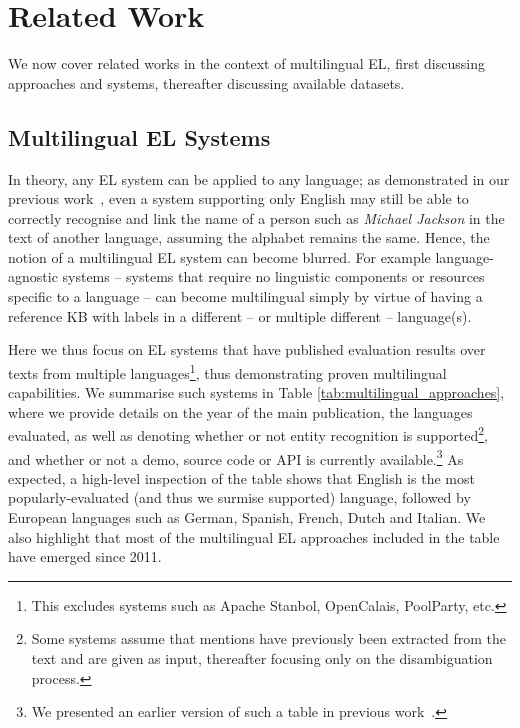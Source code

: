 \documentclass{llncs}
\begin{document}
\section{Related Work}
\label{sec:relatedWork}

We now cover related works in the context of multilingual EL, first discussing approaches and systems, thereafter discussing available datasets.

\subsection{Multilingual EL Systems}
In theory, any EL system can be applied to any language; as demonstrated in our previous work~\cite{Rosales-MendezP17}, even a system supporting only English may still be able to correctly recognise and link the name of a person such as \textit{Michael Jackson} in the text of another language, assuming the alphabet remains the same. Hence, the notion of a multilingual EL system can become blurred. For example language-agnostic systems -- systems that require no linguistic components or resources specific to a language -- can become multilingual simply by virtue of having a reference KB with labels in a different -- or multiple different -- language(s). 

Here we thus focus on EL systems that have published evaluation results over texts from multiple languages\footnote{This excludes systems such as Apache Stanbol, OpenCalais, PoolParty, etc.}, thus demonstrating proven multilingual capabilities. We summarise such systems in Table \ref{tab:multilingual_approaches}, where we provide details on the year of the main publication, the languages evaluated, as well as denoting whether or not entity recognition is supported\footnote{Some systems assume that mentions have previously been extracted from the text and are given as input, thereafter focusing only on the disambiguation process.}, and whether or not a demo, source code or API is currently available.\footnote{We presented an earlier version of such a table in previous work~\cite{Rosales-MendezP17}.} As expected, a high-level inspection of the table shows that English is the most popularly-evaluated (and thus we surmise supported) language, followed by European languages such as German, Spanish, French, Dutch and Italian. We also highlight that most of the multilingual EL approaches included in the table have emerged since 2011.
\end{document}

